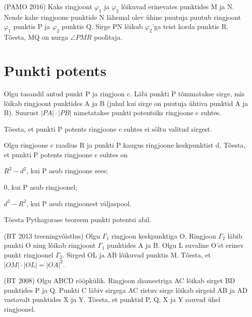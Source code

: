 \documentclass[a4paper,11pt,twocolumn]{article}
\begin{document}
\begin{question}
	(PAMO 2016) Kaks ringjoont $\varphi_1$ ja $\varphi_2$ lõikuvad erinevates punktides M ja N. Nende kahe ringjoone punktide N lähemal olev ühine puutuja puutub ringjoont $\varphi_1$ punktis P ja $\varphi_2$ punktis Q. Sirge PN lõikub $\varphi_2$'ga teist korda punktis R. Tõesta, MQ on nurga $\angle PMR$ poolitaja.
\end{question}

\section{Punkti potents}

Olgu tasandil antud punkt P ja ringjoon c. Läbi punkti P tõmmatakse sirge, mis lõikab ringjoont punktides A ja B (juhul kui sirge on puutuja ühtiva punktid A ja B). Suurust $|PA|\cdot|PB|$ nimetatakse punkti potentsiks ringjoone c suhtes.

\begin{question}
	Tõesta, et punkti P potents ringjoone c suhtes ei sõltu valitud sirgest.
\end{question}

\begin{question}
	Olgu ringjoone c raadius R ja punkti P kaugus ringjoone keskpunktist d. Tõesta, et punkti P potents ringjoone c suhtes on
	\begin{subquestion}
		\item $R^2 - d^2$, kui P asub ringjoone sees;
		\item 0, kui P asub ringjoonel;
		\item $d^2 - R^2$, kui P asub ringjoonest väljaspool.
	\end{subquestion}
\end{question}

\begin{question}
	Tõesta Pythagorase teoreem punkti potentsi abil.
\end{question}

\begin{question}
	(BT 2013 treeningvõistlus) Olgu $\Gamma_1$ ringjoon keskpunktiga O. Ringjoon $\Gamma_2$ läbib punkti O ning lõikab ringjoont $\Gamma_1$ punktides A ja B. Olgu L suvaline O'st erinev punkt ringjoonel $\Gamma_2$. Sirged OL ja AB lõikuvad punktis M. Tõesta, et $|OM|\cdot|OL|=|OA|^2$.
\end{question}

\begin{question}
	(BT 2008) Olgu ABCD rööpkülik. Ringjoon diameetriga AC lõikab sirget BD punktides P ja Q. Punkti C läbiv sirgega AC ristuv sirge lõikab sirgeid AB ja AD vastavalt punktides X ja Y. Tõesta, et punktid P, Q, X ja Y sauvad ühel ringjoonel.
\end{question}
\end{document}
